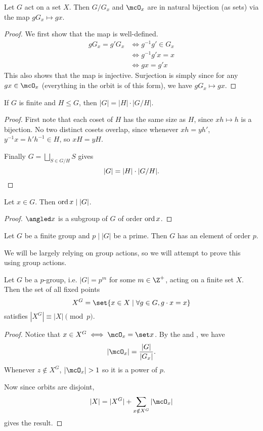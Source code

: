 
\begin{theorem*} \label{thm:orbit-stab}
    Let $G$ act on a set $X$.
    Then $G/G_x$ and $\mcO_x$ are in natural bijection (as sets)
    via the map $gG_x \mapsto gx$.
\end{theorem*}
\begin{proof}
    We first show that the map is well-defined.
    \begin{align*}
        g G_x = g' G_x &\iff g^{-1} g' \in G_x \\
            &\iff g^{-1} g' x = x \\
            &\iff g x = g' x
    \end{align*}
    This also shows that the map is injective.
    Surjection is simply since for any $gx \in \mcO_x$
    (everything in the orbit is of this form), we have $gG_x \mapsto gx$.
\end{proof}

\begin{theorem*} \label{thm:lagrange}
    If $G$ is finite and $H \le G$,
    then $|G| = |H| \cdot |G/H|$.
\end{theorem*}
\begin{proof}
    First note that each coset of $H$ has the same size as $H$,
    since $xh \mapsto h$ is a bijection.
    No two distinct cosets overlap, since whenever $xh = yh'$,
    $y^{-1} x = h' h^{-1} \in H$, so $xH = yH$.

    Finally $G = \bigsqcup_{S \in G/H} S$ gives \[
        |G| = |H| \cdot |G/H|. \qedhere
    \]
\end{proof}

\begin{corollary}
    Let $x \in G$.
    Then $\operatorname{ord} x \mid |G|$.
\end{corollary}
\begin{proof}
    $\angled x$ is a subgroup of $G$ of order $\operatorname{ord} x$.
\end{proof}

\begin{corollary*} \label{thm:cauchy}
    Let $G$ be a finite group and $p \mid |G|$ be a prime.
    Then $G$ has an element of order $p$.
\end{corollary*}
We will be largely relying on group actions, so we will attempt to
prove this using group actions.
\begin{lemma}
    Let $G$ be a $p$-group, i.e. $|G| = p^m$ for some $m \in \Z^+$,
    acting on a finite set $X$.
    Then the set of all fixed points \[
        X^G = \set{x \in X \mid \forall g \in G, g \cdot x = x}
    \] satisfies $|X^G| \equiv |X| \pmod p$.
\end{lemma}
\begin{proof}
    Notice that $x \in X^G \iff \mcO_x = \set x$.
    By the  and , we have \[
        |\mcO_x| = \frac{|G|}{|G_x|}.
    \] Whenever $z \notin X^G$, $|\mcO_x| > 1$ so it is a power of $p$.

    Now since orbits are disjoint, \[
        |X| = |X^G| + \sum_{x \notin X^G} |\mcO_x|
    \] gives the result.
\end{proof}

